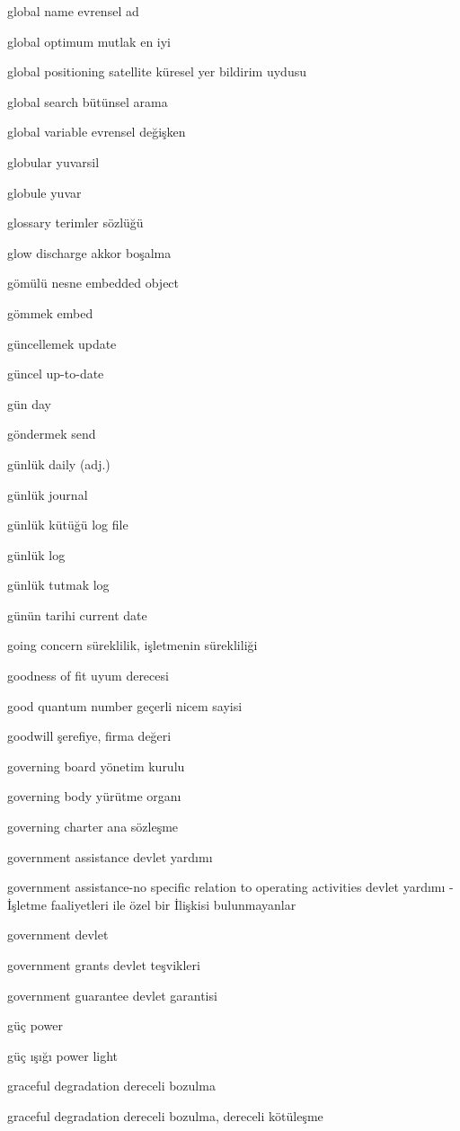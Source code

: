 \documentclass[12pt,fleqn]{article}\usepackage{../../common}
\begin{document}
global name evrensel ad

global optimum mutlak en iyi

global positioning satellite küresel yer bildirim uydusu

global search bütünsel arama

global variable evrensel değişken

globular yuvarsil

globule yuvar

glossary terimler sözlüğü

glow discharge akkor boşalma

gömülü nesne embedded object

gömmek embed

güncellemek update

güncel up-to-date

gün day

göndermek send

günlük daily (adj.)

günlük journal

günlük kütüğü log file

günlük log

günlük tutmak log

günün tarihi current date

going concern süreklilik, işletmenin sürekliliği

goodness of fit uyum derecesi

good quantum number geçerli nicem sayisi

goodwill şerefiye, firma değeri

governing board yönetim kurulu

governing body yürütme organı

governing charter ana sözleşme

government assistance devlet yardımı

government assistance-no specific relation to operating activities devlet yardımı - İşletme faaliyetleri ile özel bir İlişkisi bulunmayanlar

government devlet

government grants devlet teşvikleri

government guarantee devlet garantisi

güç power

güç ışığı power light

graceful degradation dereceli bozulma

graceful degradation dereceli bozulma, dereceli kötüleşme
\end{document}
